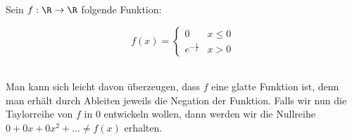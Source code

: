 \begin{example}[Gegenbeispiel]\label{ex_taylor_series_counterex}
    Sein $f: \R \to \R$ folgende Funktion:
    
\begin{minipage}[c]{0.4\linewidth}
$$f(x) = \begin{cases}0 & x\leq 0 \\ e^{-\frac{1}{x}} & x>0 \end{cases}$$\\
\end{minipage} 
\hspace{2em}
\begin{minipage}[]{0.4\linewidth}
\end{minipage}\hfill

Man kann sich leicht davon überzeugen, dass $f$ eine glatte Funktion ist, denn man erhält durch Ableiten jeweils die Negation der Funktion. Falls wir nun die Taylorreihe von $f$ in $0$ entwickeln wollen, dann werden wir die Nullreihe $0+0x+0x^2+... \neq f(x)$ erhalten.
\end{example}
